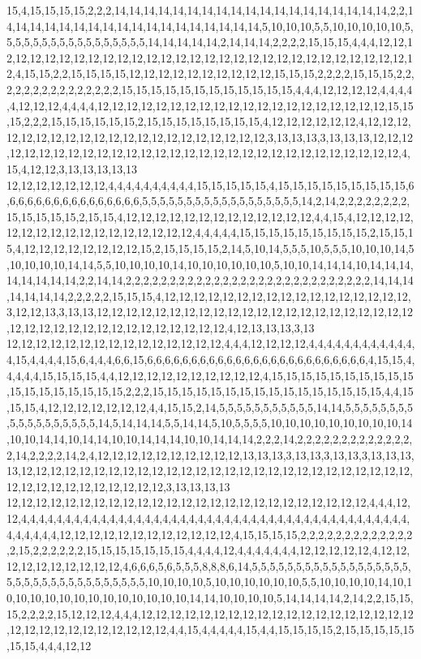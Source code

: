 15,4,15,15,15,15,2,2,2,14,14,14,14,14,14,14,14,14,14,14,14,14,14,14,14,14,14,14,2,2,14,14,14,14,14,14,14,14,14,14,14,14,14,14,14,14,14,14,5,10,10,10,5,5,10,10,10,10,10,5,5,5,5,5,5,5,5,5,5,5,5,5,5,5,5,5,14,14,14,14,14,2,14,14,14,2,2,2,2,15,15,15,4,4,4,12,12,12,12,12,12,12,12,12,12,12,12,12,12,12,12,12,12,12,12,12,12,12,12,12,12,12,12,12,12,12,4,15,15,2,2,15,15,15,15,12,12,12,12,12,12,12,12,12,12,15,15,15,2,2,2,2,15,15,15,2,2,2,2,2,2,2,2,2,2,2,2,2,2,2,15,15,15,15,15,15,15,15,15,15,15,15,4,4,4,12,12,12,12,4,4,4,4,4,12,12,12,4,4,4,4,12,12,12,12,12,12,12,12,12,12,12,12,12,12,12,12,12,12,12,12,15,15,15,2,2,2,15,15,15,15,15,15,2,15,15,15,15,15,15,15,15,4,12,12,12,12,12,12,4,12,12,12,12,12,12,12,12,12,12,12,12,12,12,12,12,12,12,12,12,12,3,13,13,13,3,13,13,13,12,12,12,12,12,12,12,12,12,12,12,12,12,12,12,12,12,12,12,12,12,12,12,12,12,12,12,12,12,12,4,15,4,12,12,3,13,13,13,13,13
12,12,12,12,12,12,12,4,4,4,4,4,4,4,4,4,4,15,15,15,15,15,4,15,15,15,15,15,15,15,15,15,6,6,6,6,6,6,6,6,6,6,6,6,6,6,6,6,5,5,5,5,5,5,5,5,5,5,5,5,5,5,5,5,5,5,14,2,14,2,2,2,2,2,2,2,2,15,15,15,15,15,2,15,15,4,12,12,12,12,12,12,12,12,12,12,12,12,12,4,4,15,4,12,12,12,12,12,12,12,12,12,12,12,12,12,12,12,12,12,4,4,4,4,4,15,15,15,15,15,15,15,15,15,2,15,15,15,4,12,12,12,12,12,12,12,12,15,2,15,15,15,15,2,14,5,10,14,5,5,5,10,5,5,5,10,10,10,14,5,10,10,10,10,14,14,5,5,10,10,10,10,14,10,10,10,10,10,10,5,10,10,14,14,14,10,14,14,14,14,14,14,14,14,2,2,14,14,2,2,2,2,2,2,2,2,2,2,2,2,2,2,2,2,2,2,2,2,2,2,2,2,2,2,2,2,14,14,14,14,14,14,14,2,2,2,2,2,15,15,15,4,12,12,12,12,12,12,12,12,12,12,12,12,12,12,12,12,12,3,12,12,13,3,13,13,12,12,12,12,12,12,12,12,12,12,12,12,12,12,12,12,12,12,12,12,12,12,12,12,12,12,12,12,12,12,12,12,12,12,12,12,12,4,12,13,13,13,3,13
12,12,12,12,12,12,12,12,12,12,12,12,12,12,12,4,4,4,12,12,12,12,4,4,4,4,4,4,4,4,4,4,4,4,4,15,4,4,4,4,15,6,4,4,4,6,6,15,6,6,6,6,6,6,6,6,6,6,6,6,6,6,6,6,6,6,6,6,6,6,6,6,6,4,15,15,4,4,4,4,4,15,15,15,15,4,4,12,12,12,12,12,12,12,12,12,12,4,15,15,15,15,15,15,15,15,15,15,15,15,15,15,15,15,15,15,2,2,2,15,15,15,15,15,15,15,15,15,15,15,15,15,15,15,15,4,4,15,15,15,4,12,12,12,12,12,12,12,4,4,15,15,2,14,5,5,5,5,5,5,5,5,5,5,5,14,14,5,5,5,5,5,5,5,5,5,5,5,5,5,5,5,5,5,5,14,5,14,14,14,5,5,14,14,5,10,5,5,5,5,10,10,10,10,10,10,10,10,10,14,10,10,14,14,10,14,14,10,10,14,14,14,10,10,14,14,14,2,2,2,14,2,2,2,2,2,2,2,2,2,2,2,2,2,2,14,2,2,2,2,14,2,4,12,12,12,12,12,12,12,12,12,12,13,13,13,3,13,13,3,13,13,3,13,13,13,13,12,12,12,12,12,12,12,12,12,12,12,12,12,12,12,12,12,12,12,12,12,12,12,12,12,12,12,12,12,12,12,12,12,12,12,12,12,12,3,13,13,13,13
12,12,12,12,12,12,12,12,12,12,12,12,12,12,12,12,12,12,12,12,12,12,12,12,12,4,4,4,12,12,4,4,4,4,4,4,4,4,4,4,4,4,4,4,4,4,4,4,4,4,4,4,4,4,4,4,4,4,4,4,4,4,4,4,4,4,4,4,4,4,4,4,4,4,4,4,4,4,4,4,12,12,12,12,12,12,12,12,12,12,12,12,4,15,15,15,15,2,2,2,2,2,2,2,2,2,2,2,2,2,2,15,2,2,2,2,2,2,15,15,15,15,15,15,15,4,4,4,4,12,4,4,4,4,4,4,4,12,12,12,12,12,4,12,12,12,12,12,12,12,12,12,12,4,6,6,6,5,6,5,5,5,8,8,8,6,14,5,5,5,5,5,5,5,5,5,5,5,5,5,5,5,5,5,5,5,5,5,5,5,5,5,5,5,5,5,5,5,5,5,5,10,10,10,10,5,10,10,10,10,10,10,5,5,10,10,10,10,14,10,10,10,10,10,10,10,10,10,10,10,10,10,10,14,14,10,10,10,10,5,14,14,14,14,2,14,2,2,15,15,15,2,2,2,2,15,12,12,12,4,4,4,12,12,12,12,12,12,12,12,12,12,12,12,12,12,12,12,12,12,12,12,12,12,12,12,12,12,12,12,12,12,4,4,15,4,4,4,4,4,15,4,4,15,15,15,15,2,15,15,15,15,15,15,15,4,4,4,12,12
